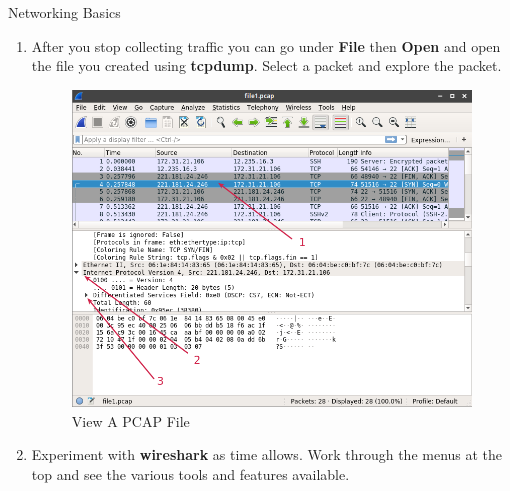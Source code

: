 \begin{Lab}
\begin{exe} {Networking Basics}
\begin{enumerate}
		\item
			After you stop collecting traffic you can go
			under \textbf{File} then \textbf{Open} and
			open the  file you
			created using \textbf{tcpdump}. Select a 
			packet and explore the packet.
   \begin{figure}[H]
   \includegraphics[width=6.4in]{IMAGES/wireshark3}
   \caption{View A PCAP File}
      \end{figure}

		\item 
			Experiment with \textbf{wireshark} as 
			time allows. Work through the menus at
			the top and see the various tools and
			features available.
        \end{enumerate}

\end{exe}
\end{Lab}
